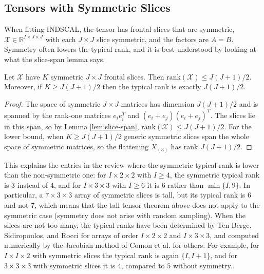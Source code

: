 \subsection{Tensors with Symmetric Slices}

  When fitting INDSCAL, the tensor has frontal slices that are symmetric, $\mathcal{X} \in \mathbb{R}^{I \times J \times J}$ with each $J \times J$ slice symmetric, and the factors are $A = B$. Symmetry often lowers the typical rank, and it is best understood by looking at what the slice-span lemma says.

  \begin{lemma}
    \label{prop:symmetric-slices}
    Let $\mathcal{X}$ have $K$ symmetric $J \times J$ frontal slices. Then $\mathrm{rank}(\mathcal{X}) \leq J(J+1)/2$. Moreover, if $K \geq J(J+1)/2$ then the typical rank is exactly $J(J+1)/2$.
  \end{lemma}
  \begin{proof}
    The space of symmetric $J \times J$ matrices has dimension $J(J+1)/2$ and is spanned by the rank-one matrices $e_i e_i^T$ and $(e_i + e_j)(e_i + e_j)^T$. The slices lie in this span, so by Lemma \ref{lem:slice-span}, $\mathrm{rank}(\mathcal{X}) \leq J(J+1)/2$. For the lower bound, when $K \geq J(J+1)/2$ generic symmetric slices span the whole space of symmetric matrices, so the flattening $X_{(3)}$ has rank $J(J+1)/2$.
  \end{proof}

  This explains the entries in the review where the symmetric typical rank is lower than the non-symmetric one: for $I \times 2 \times 2$ with $I \geq 4$, the symmetric typical rank is $3$ instead of $4$, and for $I \times 3 \times 3$ with $I \geq 6$ it is $6$ rather than $\min\{I, 9\}$. In particular, a $7 \times 3 \times 3$ array of symmetric slices is tall, but its typical rank is $6$ and not $7$, which means that the tall tensor theorem above does not apply to the symmetric case (symmetry does not arise with random sampling). When the slices are not too many, the typical ranks have been determined by Ten Berge, Sidiropoulos, and Rocci for arrays of order $I \times 2 \times 2$ and $I \times 3 \times 3$, and computed numerically by the Jacobian method of Comon et al. for others. For example, for $I \times I \times 2$ with symmetric slices the typical rank is again $\{I, I+1\}$, and for $3 \times 3 \times 3$ with symmetric slices it is $4$, compared to $5$ without symmetry.

